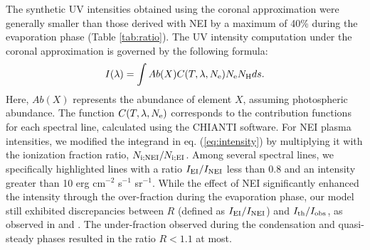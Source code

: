 \documentclass[fleqn,usenatbib]{mnras}
\begin{document}
The synthetic UV intensities obtained using the coronal approximation were generally smaller than those derived with NEI by a maximum of 40\% during the evaporation phase (Table \ref{tab:ratio}). The UV intensity computation under the coronal approximation is governed by the following formula:
\begin{eqnarray}
    I(\lambda) = \int Ab(X) C(T, \lambda, N_{\rm e}) N_{\rm e} N_{\rm H} ds. \label{eq:intensity}
\end{eqnarray}
Here, $Ab(X)$ represents the abundance of element $X$, assuming photospheric abundance. The function $C(T, \lambda, N_{\rm e})$ corresponds to the contribution functions for each spectral line, calculated using the CHIANTI software.
For NEI plasma intensities, we modified the integrand in eq. (\ref{eq:intensity}) by multiplying it with the ionization fraction ratio, $N_{\rm i;NEI}/N_{\rm i;EI}$. Among several spectral lines, we specifically highlighted lines with a ratio $I_{\rm EI}/I_{\rm NEI}$ less than 0.8 and an intensity greater than 10 erg cm$^{-2}$ s$^{-1}$ sr$^{-1}$.
While the effect of NEI significantly enhanced the intensity through the over-fraction during the evaporation phase, our model still exhibited discrepancies between $R$ (defined as $I_{\rm EI}/I_{\rm NEI}$) and $I_{\rm th}/I_{\rm obs}$, as observed in \cite{1995ApJ...455L..85J} and \cite{2023MNRAS.521.4696D}. The under-fraction observed during the condensation and quasi-steady phases resulted in the ratio $R<1.1$ at most.
\end{document}
